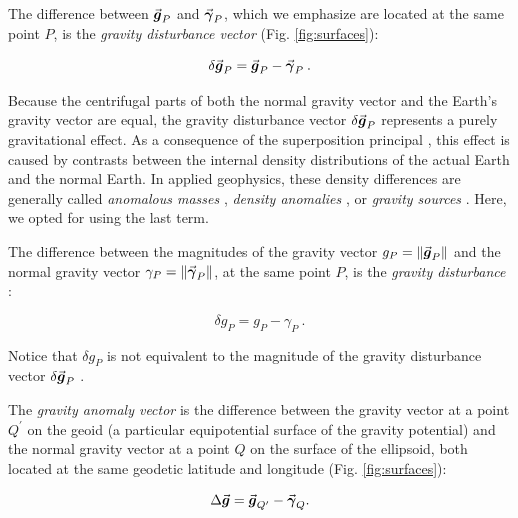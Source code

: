 \documentclass[extra]{gji}
\renewcommand{\vector}[1]{\vec{\mitbf{#1}}}
\begin{document}
The difference between $\vector{g}_{P}$ and $\vector{\gamma}_{P}$,
which we emphasize are located at the same point $P$,
is the \textit{gravity disturbance vector} (Fig. \ref{fig:surfaces}):

\begin{equation}
\delta \vector{g}_{P} =
\vector{g}_{P} - \vector{\gamma}_{P} \: .
\label{eq:gravity-disturbance-vector}
\end{equation}

Because the centrifugal parts of both the normal gravity vector
and the Earth's gravity vector are equal,
the gravity disturbance vector $\delta \vector{g}_{P}$
represents a purely gravitational effect.
As a consequence of the superposition principal \citep{blakely1996},
this effect is caused by contrasts between
the internal density distributions
of the actual Earth and the normal Earth.
In applied geophysics, these density differences are generally called
\textit{anomalous masses} \citep[e.g.,][]{hammer1945,lafehr1965},
\textit{density anomalies} \citep[e.g.,][]{forsberg1984},
or \textit{gravity sources} \citep[e.g.,][]{blakely1996}.
Here, we opted for using the last term.

The difference between the magnitudes of the gravity vector
$g_{P} = \| \vector{g}_{P} \|$ and the normal gravity vector
$\gamma_{P} = \| \vector{\gamma}_{P} \|$,
at the same point $P$, is the \textit{gravity disturbance}
\citep{heiskanen-moritz1967, hofmann-wellenhof-moritz2005}:

\begin{equation}
\delta g_{P} = g_{P} - \gamma_{P} \: .
\label{eq:gravity-disturbance}
\end{equation}

\noindent
Notice that $\delta g_{P}$ is not equivalent
to the magnitude of the gravity disturbance vector
$\delta \vector{g}_{P}$ \citep{barthelmes2013, sanso_sideris2013}.

The \textit{gravity anomaly vector}
is the difference between the gravity
vector at a point $Q^{\prime}$ on the geoid
(a particular equipotential surface of the gravity potential)
and the normal gravity vector at a point $Q$ on the surface of the ellipsoid,
both located at the same geodetic latitude and longitude
(Fig. \ref{fig:surfaces}):

\begin{equation}
\Delta \vector{g} = \vector{g}_{Q^{\prime}} - \vector{\gamma}_{Q} .
\label{eq:gravity-anomaly-vector}
\end{equation}
\end{document}
